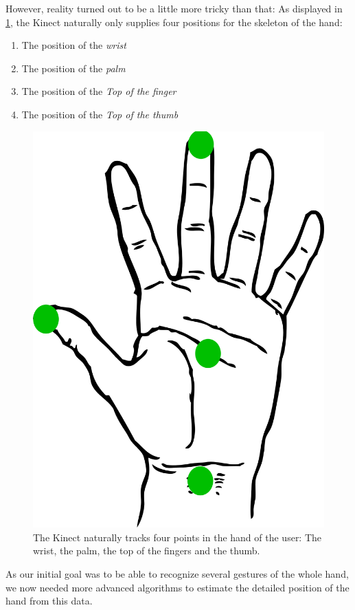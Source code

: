 \documentclass[11pt,a4paper,oldfontcommands, oneside]{memoir}
\begin{document}
However, reality turned out to be a little more tricky than that: As displayed in \ref{fig:palm-four-pos}, the Kinect naturally only supplies four positions for the skeleton of the hand:
\begin{enumerate}
\item The position of the \emph{wrist}
\item The position of the \emph{palm}
\item The position of the \emph{Top of the finger}
\item The position of the \emph{Top of the thumb}
\end{enumerate}
%
\begin{figure}
 \centering
 \includegraphics[scale=0.75]{./figures/palm}
 \caption{The Kinect naturally tracks four points in the hand of the user: The wrist, the palm, the top of the fingers and the thumb.}
 \label{fig:palm-four-pos}
\end{figure}
%
As our initial goal was to be able to recognize several gestures of the whole hand, we now needed more advanced algorithms to estimate the detailed position of the hand from this data.
\end{document}
